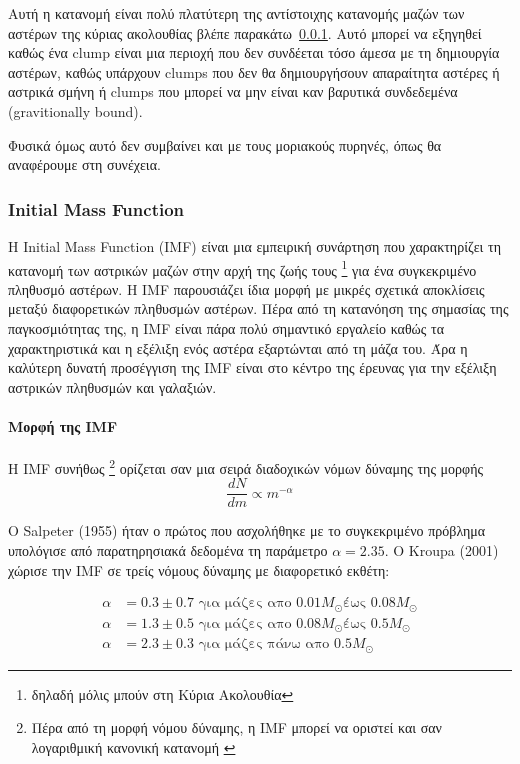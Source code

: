 \documentclass[a4paper,12pt]{memoir}
\newcommand{\sm}{$M_{\odot}$}
\begin{document}
Αυτή η κατανομή είναι πολύ πλατύτερη της αντίστοιχης κατανομής μαζών των αστέρων της κύριας ακολουθίας βλέπε παρακάτω~\ref{par:imf}. Αυτό μπορεί να εξηγηθεί καθώς ένα clump είναι μια περιοχή που δεν συνδέεται τόσο άμεσα με τη δημιουργία αστέρων, καθώς υπάρχουν clumps που δεν θα δημιουργήσουν απαραίτητα αστέρες ή αστρικά σμήνη ή clumps που μπορεί να μην είναι καν βαρυτικά συνδεδεμένα (gravitionally bound).

Φυσικά όμως αυτό δεν συμβαίνει και με τους μοριακούς πυρηνές, όπως θα αναφέρουμε στη συνέχεια. 

\subsubsection{Initial Mass Function}
\label{par:imf}
Η Initial Mass Function (IMF) είναι μια εμπειρική συνάρτηση που χαρακτηρίζει τη κατανομή των αστρικών μαζών στην αρχή της ζωής τους \footnote{δηλαδή μόλις μπούν στη Κύρια Ακολουθία} για ένα συγκεκριμένο πληθυσμό αστέρων. Η IMF παρουσιάζει ίδια μορφή με μικρές σχετικά αποκλίσεις μεταξύ διαφορετικών πληθυσμών αστέρων. 
Πέρα από τη κατανόηση της σημασίας της παγκοσμιότητας της, η IMF είναι πάρα πολύ σημαντικό εργαλείο καθώς τα χαρακτηριστικά και η εξέλιξη ενός αστέρα εξαρτώνται από τη μάζα του. 
Άρα η καλύτερη δυνατή προσέγγιση της IMF είναι στο κέντρο της έρευνας για την εξέλιξη αστρικών πληθυσμών και γαλαξιών.

\paragraph{Μορφή της IMF}
Η IMF συνήθως \footnote{Πέρα από τη μορφή νόμου δύναμης, η IMF μπορεί να οριστεί και σαν λογαριθμική κανονική κατανομή \cite{salpeter_initial_2005}} ορίζεται σαν μια σειρά διαδοχικών νόμων δύναμης της μορφής 
\begin{equation}
\frac{dN}{dm} \propto m^{-\alpha}
\end{equation}

Ο Salpeter (1955) ήταν ο πρώτος που ασχολήθηκε με το συγκεκριμένο πρόβλημα υπολόγισε από παρατηρησιακά δεδομένα τη παράμετρο $\alpha=2.35$.
Ο Kroupa (2001) χώρισε την IMF σε τρείς νόμους δύναμης με διαφορετικό εκθέτη:

\begin{align}
\alpha&=0.3 \pm 0.7 \text{ για μάζες απο $0.01$\sm έως $0.08$\sm} \\
\alpha&=1.3 \pm 0.5 \text{ για μάζες απο $0.08$\sm έως $0.5$\sm} \\
\alpha&=2.3 \pm 0.3 \text{ για μάζες πάνω απο $0.5$\sm}
\end{align}
\end{document}
